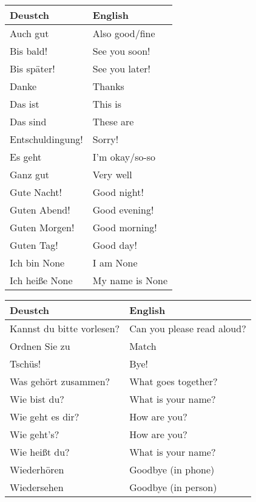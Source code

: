 \documentclass{article}
\renewcommand{\arraystretch}{1}
\begin{document}
\begin{minipage}{0.48\textwidth}
    \centering
    \renewcommand{\arraystretch}{1.5}
    \begin{tabular}{|>{\raggedright\arraybackslash}p{3.5cm}|>{\raggedright\arraybackslash}p{3.5cm}|}
        \hline
        \rowcolor{gray!20} \textbf{Deustch} & \textbf{English} \\
        \hline
        Auch gut & Also good/fine \\\hline
        Bis bald! & See you soon! \\\hline
        Bis später! & See you later! \\\hline
        Danke &  Thanks \\\hline
        Das ist &  This is \\\hline
        Das sind &  These are \\\hline
        Entschuldingung! & Sorry! \\\hline
        Es geht & I'm okay/so-so \\\hline
        Ganz gut & Very well \\\hline
        Gute Nacht! &  Good night! \\\hline
        Guten Abend! &  Good evening! \\\hline
        Guten Morgen! &  Good morning! \\\hline
        Guten Tag! &  Good day! \\\hline
        Ich bin None & I am None \\\hline
        Ich hei\ss{}e None & My name is None \\\hline
    \end{tabular}
\end{minipage}%
\hfill
\begin{minipage}{0.48\textwidth}
    \centering
    \renewcommand{\arraystretch}{1.5}
    \begin{tabular}{|>{\raggedright\arraybackslash}p{3.5cm}|>{\raggedright\arraybackslash}p{3.5cm}|}
        \hline
        \rowcolor{gray!20} \textbf{Deustch} & \textbf{English} \\
        \hline
        Kannst du bitte vorlesen? &  Can you please read aloud? \\\hline
        Ordnen Sie zu & Match \\\hline
        Tschüs! & Bye! \\\hline
        Was gehört zusammen? & What goes together? \\\hline
        Wie bist du? & What is your name? \\\hline
        Wie geht es dir? &  How are you? \\\hline
        Wie geht's? &  How are you? \\\hline
        Wie hei\ss{}t du? & What is your name? \\\hline
        Wiederhören & Goodbye (in phone) \\\hline
        Wiedersehen & Goodbye (in person) \\\hline
    \end{tabular}
\end{minipage}
\end{document}

